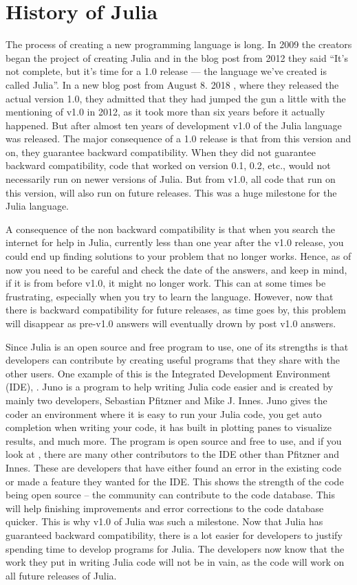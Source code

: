 \section{History of Julia}
The process of creating a new programming language is long. In 2009 the creators began the project of creating Julia and in the blog post \emph{\citep{juliaBlogRelease2012}} from 2012 they said \enquote{It's not complete, but it's time for a 1.0 release — the language we’ve created is called Julia}. In a new blog post from August 8. 2018 \emph{\citep{juliaBlogReleaseV1.0}}, where they released the actual version 1.0, they admitted that they had jumped the gun a little with the mentioning of v1.0 in 2012, as it took more than six years before it actually happened. But after almost ten years of development v1.0 of the Julia language was released. The major consequence of a 1.0 release is that from this version and on, they guarantee backward compatibility. When they did not guarantee backward compatibility, code that worked on version 0.1, 0.2, etc., would not necessarily run on newer versions of Julia. But from v1.0, all code that run on this version, will also run on future releases. This was a huge milestone for the Julia language. 

A consequence of the non backward compatibility is that when you search the internet for help in Julia, currently less than one year after the v1.0 release, you could end up finding solutions to your problem that no longer works. Hence, as of now you need to be careful and check the date of the answers, and keep in mind, if it is from before v1.0, it might no longer work. This can at some times be frustrating, especially when you try to learn the language. However, now that there is backward compatibility for future releases, as time goes by, this problem will disappear as pre-v1.0 answers will eventually drown by post v1.0 answers.

Since Julia is an open source and free program to use, one of its strengths is that developers can contribute by creating useful programs that they share with the other users. One example of this is the Integrated Development Environment (IDE), \cite{JunoIDE}. Juno is a program to help writing Julia code easier and is created by mainly two developers, Sebastian Pfitzner and Mike J. Innes. Juno gives the coder an environment where it is easy to run your Julia code, you get auto completion when writing your code, it has built in plotting panes to visualize results, and much more. The program is open source and free to use, and if you look at \cite{JunoGithub}, there are many other contributors to the IDE other than Pfitzner and Innes. These are developers that have either found an error in the existing code or made a feature they wanted for the IDE. This shows the strength of the code being open source -- the community can contribute to the code database. This will help finishing improvements and error corrections to the code database quicker. This is why v1.0 of Julia was such a milestone. Now that Julia has guaranteed backward compatibility, there is a lot easier for developers to justify spending time to develop programs for Julia. The developers now know that the work they put in writing Julia code will not be in vain, as the code will work on all future releases of Julia. 

